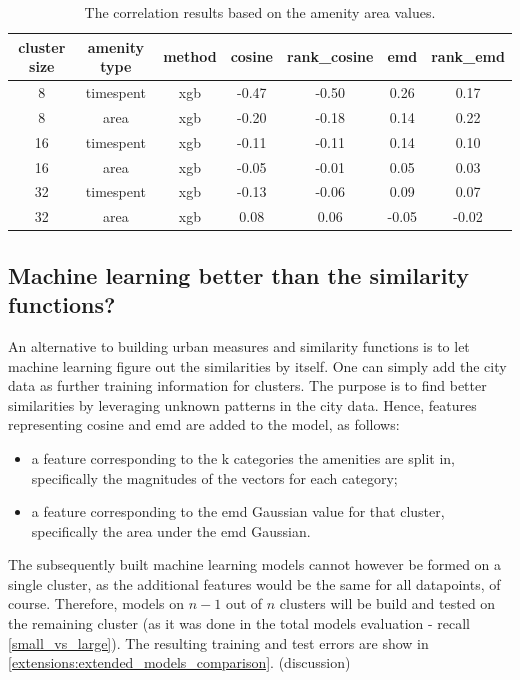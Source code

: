 {\begin{table}[!ht]
	{\color{green}
	\centering
	\small
	\begin{tabular}{ | c | c | c | c | c | c | c | }
		\hline
		{cluster size} & {amenity type} & method & cosine & rank\_cosine & emd & rank\_emd \\ \hline
		8 & timespent & xgb & -0.47 & -0.50 & 0.26 & 0.17 \\ \hline
		8 & area & xgb & -0.20 & -0.18 & 0.14 & 0.22 \\ \hline
		16 & timespent & xgb & -0.11 & -0.11 & 0.14 & 0.10 \\ \hline
		16 & area & xgb & -0.05 & -0.01 & 0.05 & 0.03 \\ \hline
		32 & timespent & xgb & -0.13 & -0.06 & 0.09 & 0.07 \\ \hline
		32 & area & xgb & 0.08 & 0.06 & -0.05 & -0.02 \\ \hline
	\end{tabular}%
	\caption{\color{green} The correlation results based on the amenity area values.}
	\label{extensions:correlation_amenity_area}}
\end{table}

\subsection{Machine learning better than the similarity functions?}
\label{extensions:machine_learning_better}
An alternative to building urban measures and similarity functions is to let machine learning figure out the similarities by itself. One can simply add the city data as further training information for clusters. The purpose is to find better similarities by leveraging unknown patterns in the city data. Hence, features representing cosine and emd are added to the model, as follows: 
\begin{itemize}
	\item a feature corresponding to the k categories the amenities are split in, specifically the magnitudes of the vectors for each category;
	\item a feature corresponding to the emd Gaussian value for that cluster, specifically the area under the emd Gaussian.
\end{itemize}
The subsequently built machine learning models cannot however be formed on a single cluster, as the additional features would be the same for all datapoints, of course. Therefore, models on $n-1$ out of $n$ clusters will be build and tested on the remaining cluster (as it was done in the total models evaluation - recall \autoref{small_vs_large}). The resulting training and test errors are show in \autoref{extensions:extended_models_comparison}. (discussion)

}
